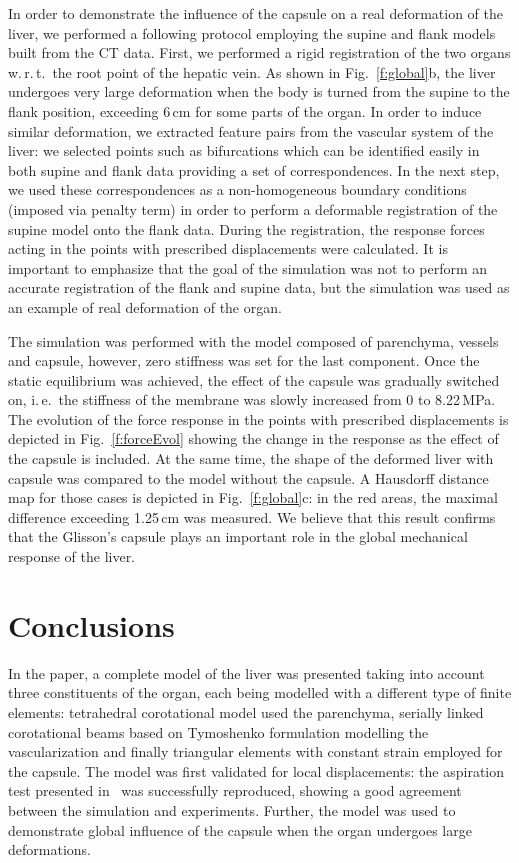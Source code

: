 \documentclass{llncs}
\def\wrt{w.\,r.\,t.}
\def\ie{i.\,e.}
\begin{document}
In order to demonstrate the influence of the capsule on a real deformation of the liver, we 
performed a following protocol employing the supine and flank models built from the CT data. 
First, we performed a rigid registration of the two organs \wrt\ the root point of the hepatic vein. 
As shown in Fig.~\ref{f:global}b, the liver undergoes very large deformation when the body 
is turned from the supine to the flank position, exceeding 6\,cm for some parts of the organ. 
In order to induce similar deformation, we extracted feature pairs from the vascular system of the liver:
we selected points such as bifurcations which can be identified easily in both supine and flank 
data providing a set of correspondences. In the next step, we used these correspondences as a non-homogeneous
boundary conditions (imposed via penalty term) in order to perform a deformable registration of the supine
model onto the flank data. During the registration, the response forces acting in the points with prescribed displacements
were calculated. It is important to emphasize that the goal of the simulation was not 
to perform an accurate registration of the flank and supine data, but the simulation was used 
as an example of real deformation of the organ.

The simulation was performed with the model composed of parenchyma,  vessels and capsule, however, zero stiffness was 
set for the last component.
Once the static equilibrium was achieved, the effect of the capsule was gradually switched 
on, \ie\ the stiffness of the membrane was slowly increased from 0 to 8.22\,MPa. The evolution of the force response in the 
points with prescribed displacements is depicted in Fig.~\ref{f:forceEvol} showing the change in the response as the effect
of the capsule is included. At the same time, the shape of the deformed liver with capsule was compared 
to the model without the capsule. A Hausdorff distance map for those cases is depicted in Fig.~\ref{f:global}c: in the red areas, the 
maximal difference exceeding 1.25\,cm was measured. We believe that this result confirms that the Glisson's capsule 
plays an important role in the global mechanical response of the liver.


\section{Conclusions} %
In the paper, a complete model of the liver was presented taking into account 
three constituents of the organ, each being modelled with a different type 
of finite elements: tetrahedral corotational model used the parenchyma, serially 
linked corotational beams based on Tymoshenko formulation modelling the vascularization 
and finally triangular elements with constant strain employed for the capsule. 
The model was first validated for local displacements: the aspiration test presented in~\cite{Hollenstein2006} 
was successfully reproduced, showing a good agreement between the simulation and experiments. 
Further, the model was used to demonstrate global influence of the capsule when the organ 
undergoes large deformations. 
\end{document}
